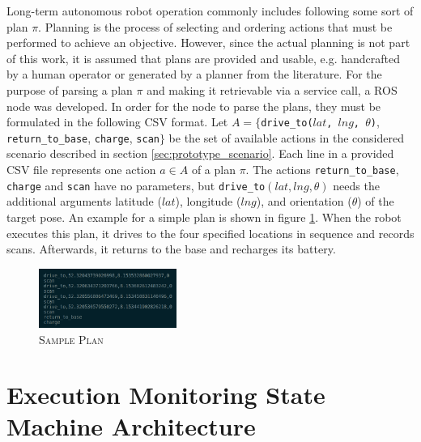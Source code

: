 \documentclass[english, master, utf8]{base/thesis_KBS}
\newcommand{\code}[1]{\colorbox{light-gray}{\texttt{#1}}}
\begin{document}
Long-term autonomous robot operation commonly includes following some sort of plan $\pi$. Planning is the process of selecting and ordering actions that must be performed to
achieve an objective. \cite{GNT:2016} However, since the actual planning is not part of this work, it is assumed that
plans are provided and usable, e.g. handcrafted by a human operator or generated by a planner from the literature.
For the purpose of parsing a plan $\pi$ and making it retrievable via a service call, a ROS node was developed.
In order for the node to parse the plans, they must be formulated in the following CSV format.
Let $A = \{$\code{drive\_to($lat$, $lng$, $\theta$)}, \code{return\_to\_base}, \code{charge}, \code{scan}$\}$ be the set of available actions in the considered scenario
described in section \ref{sec:prototype_scenario}.
Each line in a provided CSV file represents one action $a \in A$ of a plan $\pi$. The actions \code{return\_to\_base}, \code{charge} and \code{scan} have no parameters,
but \code{drive\_to$(lat, lng, \theta)$} needs the additional arguments latitude ($lat$), longitude ($lng$), and orientation ($\theta$) of the target pose.
An example for a simple plan is shown in figure \ref{fig:plan_example}. 
When the robot executes this plan, it drives to the four specified locations in sequence and records scans.
Afterwards, it returns to the base and recharges its battery.
\begin{figure}[H]
    \centering
    \includegraphics[width=0.4\textwidth]{pics/plan_example.png}
    \caption{\textsc{Sample Plan}}
    \label{fig:plan_example}
\end{figure}
\noindent

\section{Execution Monitoring State Machine Architecture}
\label{sec:execution_monitoring_smach_architecture}
\end{document}
